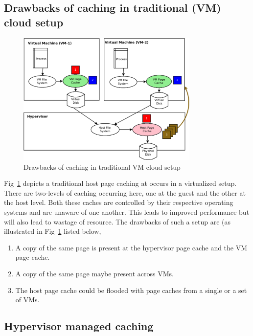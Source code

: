    \subsection{Drawbacks of caching in traditional (VM) cloud setup}
      
     \begin{figure}
      \centering
      \includegraphics[width=0.8\textwidth]{images/intro/issues_in_hypervisor.png}
      \caption{Drawbacks of caching in traditional VM cloud setup}
      \label{img:drawbacks_traditional}
    \end{figure}
    
    Fig~\ref{img:drawbacks_traditional} depicts a traditional host page caching at occurs in a virtualized setup. There are
    two-levels of caching occurring here, one at the guest and the other at the host level. 
    Both these caches are controlled by their respective operating systems and are unaware of one another.
    This leads to improved performance but will also lead to wastage of resource. 
    The drawbacks of such a setup are (as illustrated in Fig~\ref{img:drawbacks_traditional} listed below,
    
      \begin{enumerate}
	\item A copy of the same page is present at the hypervisor page cache and the VM page cache.
	\item A copy of the same page maybe present across VMs.
	\item The host page cache could be flooded with page caches from a single or a set of VMs.
      \end{enumerate}
      
   \subsection{Hypervisor managed caching}
    
